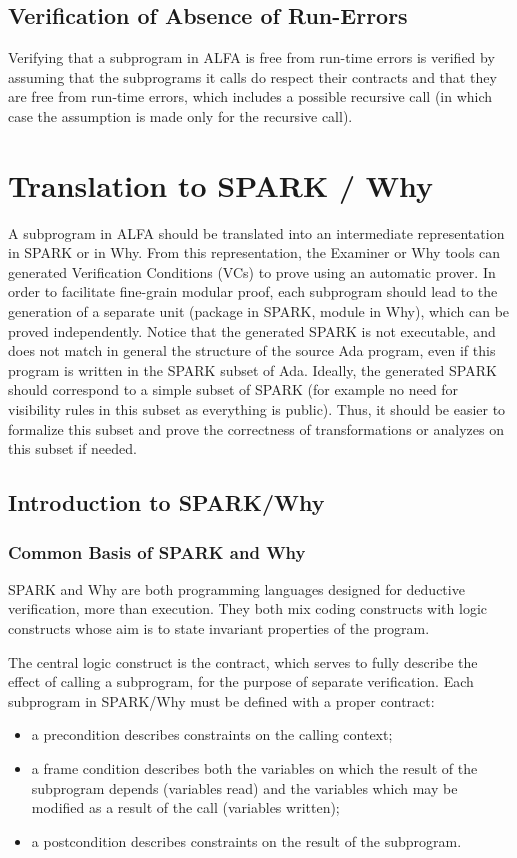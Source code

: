 \documentclass{article}
\begin{document}
\subsection{Verification of Absence of Run-Errors}

Verifying that a subprogram in ALFA is free from run-time errors is verified by
assuming that the subprograms it calls do respect their contracts and that they
are free from run-time errors, which includes a possible recursive call (in
which case the assumption is made only for the recursive call).

\section{Translation to SPARK / Why}

A subprogram in ALFA should be translated into an intermediate representation
in SPARK or in Why. From this representation, the Examiner or Why tools can
generated Verification Conditions (VCs) to prove using an automatic prover.  In
order to facilitate fine-grain modular proof, each subprogram should lead to
the generation of a separate unit (package in SPARK, module in Why), which can
be proved independently. Notice that the generated SPARK is not executable, and
does not match in general the structure of the source Ada program, even if this
program is written in the SPARK subset of Ada. Ideally, the generated SPARK
should correspond to a simple subset of SPARK (for example no need for
visibility rules in this subset as everything is public). Thus, it should be
easier to formalize this subset and prove the correctness of transformations or
analyzes on this subset if needed.

\subsection{Introduction to SPARK/Why}

\subsubsection{Common Basis of SPARK and Why}

SPARK and Why are both programming languages designed for deductive
verification, more than execution. They both mix coding constructs with logic
constructs whose aim is to state invariant properties of the program.

The central logic construct is the contract, which serves to fully describe the
effect of calling a subprogram, for the purpose of separate verification. Each
subprogram in SPARK/Why must be defined with a proper contract:
\begin{itemize}
\item a precondition describes constraints on the calling context;
\item a frame condition describes both the variables on which the result of the
  subprogram depends (variables read) and the variables which may be modified
  as a result of the call (variables written);
\item a postcondition describes constraints on the result of the subprogram.
\end{itemize}
\end{document}
